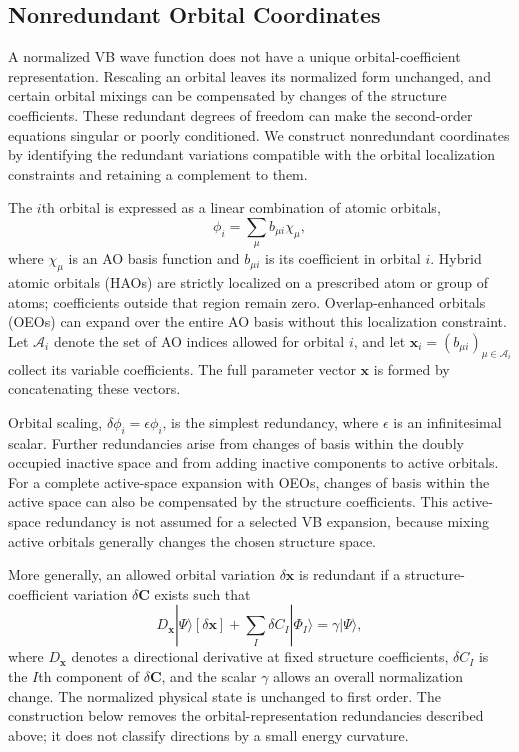 \documentclass[12pt]{article}
\begin{document}
\subsection{Nonredundant Orbital Coordinates}

A normalized VB wave function does not have a unique orbital-coefficient representation. Rescaling an orbital leaves its normalized form unchanged, and certain orbital mixings can be compensated by changes of the structure coefficients. These redundant degrees of freedom can make the second-order equations singular or poorly conditioned. We construct nonredundant coordinates by identifying the redundant variations compatible with the orbital localization constraints and retaining a complement to them.

The \(i\)th orbital is expressed as a linear combination of atomic orbitals,
\begin{equation}
 \phi_i=\sum_\mu b_{\mu i}\chi_\mu,
 \label{eq:orbitalexpansion}
\end{equation}
where \(\chi_\mu\) is an AO basis function and \(b_{\mu i}\) is its coefficient in orbital \(i\). Hybrid atomic orbitals (HAOs) are strictly localized on a prescribed atom or group of atoms; coefficients outside that region remain zero. Overlap-enhanced orbitals (OEOs) can expand over the entire AO basis without this localization constraint. Let \(\mathcal A_i\) denote the set of AO indices allowed for orbital \(i\), and let \(\mathbf x_i=(b_{\mu i})_{\mu\in\mathcal A_i}\) collect its variable coefficients. The full parameter vector \(\mathbf x\) is formed by concatenating these vectors.

Orbital scaling, \(\delta\phi_i=\epsilon\phi_i\), is the simplest redundancy, where \(\epsilon\) is an infinitesimal scalar. Further redundancies arise from changes of basis within the doubly occupied inactive space and from adding inactive components to active orbitals. For a complete active-space expansion with OEOs, changes of basis within the active space can also be compensated by the structure coefficients. This active-space redundancy is not assumed for a selected VB expansion, because mixing active orbitals generally changes the chosen structure space.

More generally, an allowed orbital variation \(\delta\mathbf x\) is redundant if a structure-coefficient variation \(\delta\mathbf C\) exists such that
\begin{equation}
 D_{\mathbf x}|\Psi\rangle[\delta\mathbf x]
 +\sum_I\delta C_I|\Phi_I\rangle=\gamma|\Psi\rangle,
 \label{eq:redundancydefinition}
\end{equation}
where \(D_{\mathbf x}\) denotes a directional derivative at fixed structure coefficients, \(\delta C_I\) is the \(I\)th component of \(\delta\mathbf C\), and the scalar \(\gamma\) allows an overall normalization change. The normalized physical state is unchanged to first order. The construction below removes the orbital-representation redundancies described above; it does not classify directions by a small energy curvature.
\end{document}
